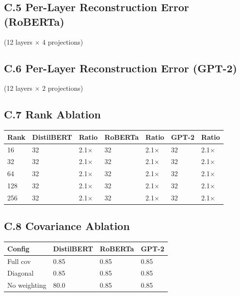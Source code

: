 \subsection{C.5 Per-Layer Reconstruction Error (RoBERTa)}

(12 layers $\times$ 4 projections)

\subsection{C.6 Per-Layer Reconstruction Error (GPT-2)}

(12 layers $\times$ 2 projections)

\subsection{C.7 Rank Ablation}

\begin{table}[H]
\centering
\small
\begin{tabular}{lllllll}
\toprule
\textbf{Rank} & \textbf{DistilBERT} & \textbf{Ratio} & \textbf{RoBERTa} & \textbf{Ratio} & \textbf{GPT-2} & \textbf{Ratio} \\
\midrule
16 & 32 & 2.1$\times$ & 32 & 2.1$\times$ & 32 & 2.1$\times$ \\
32 & 32 & 2.1$\times$ & 32 & 2.1$\times$ & 32 & 2.1$\times$ \\
64 & 32 & 2.1$\times$ & 32 & 2.1$\times$ & 32 & 2.1$\times$ \\
128 & 32 & 2.1$\times$ & 32 & 2.1$\times$ & 32 & 2.1$\times$ \\
256 & 32 & 2.1$\times$ & 32 & 2.1$\times$ & 32 & 2.1$\times$ \\
\bottomrule
\end{tabular}
\end{table}

\subsection{C.8 Covariance Ablation}

\begin{table}[H]
\centering
\small
\begin{tabular}{llll}
\toprule
\textbf{Config} & \textbf{DistilBERT} & \textbf{RoBERTa} & \textbf{GPT-2} \\
\midrule
Full cov & 0.85 & 0.85 & 0.85 \\
Diagonal & 0.85 & 0.85 & 0.85 \\
No weighting & 80.0 & 0.85 & 0.85 \\
\bottomrule
\end{tabular}
\end{table}

